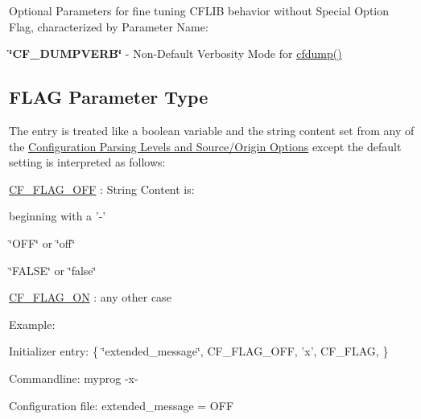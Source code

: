 Optional Parameters for fine tuning C\-F\-L\-I\-B behavior without Special Option Flag, characterized by Parameter Name\-:


\begin{DoxyItemize}
\item {\bfseries \char`\"{}\-C\-F\-\_\-\-D\-U\-M\-P\-V\-E\-R\-B\char`\"{}} -\/ Non-\/\-Default Verbosity Mode for \hyperlink{group__advanced__features_gaecfc8ee37366e1b36cb5aac0cc41ebdc}{cfdump()}
\end{DoxyItemize}\hypertarget{parameter_types_parameter_type_flag}{}\subsection{F\-L\-A\-G Parameter Type}\label{parameter_types_parameter_type_flag}
The entry is treated like a boolean variable and the string content set from any of the \hyperlink{config_levels}{Configuration Parsing Levels and Source/\-Origin Options} except the default setting is interpreted as follows\-:

\begin{DoxyItemize}
\item \hyperlink{group__cflib__core_ga7010abac2c80c121772da4d9c03332ee}{C\-F\-\_\-\-F\-L\-A\-G\-\_\-\-O\-F\-F} \-: String Content is\-:
\begin{DoxyItemize}
\item beginning with a {\ttfamily '-\/'} 
\item {\ttfamily \char`\"{}\-O\-F\-F\char`\"{}} or {\ttfamily \char`\"{}off\char`\"{}} 
\item {\ttfamily \char`\"{}\-F\-A\-L\-S\-E\char`\"{}} or {\ttfamily \char`\"{}false\char`\"{}} 
\end{DoxyItemize}\item \hyperlink{group__cflib__core_ga355c714f2912ac336b8b03468c978d8c}{C\-F\-\_\-\-F\-L\-A\-G\-\_\-\-O\-N} \-: any other case\end{DoxyItemize}
\begin{DoxyParagraph}{Example\-:}

\begin{DoxyItemize}
\item Initializer entry\-: \{ \char`\"{}extended\-\_\-message\char`\"{}, C\-F\-\_\-\-F\-L\-A\-G\-\_\-\-O\-F\-F, 'x', C\-F\-\_\-\-F\-L\-A\-G, \}
\item Commandline\-: myprog -\/x-\/
\item Configuration file\-: extended\-\_\-message = O\-F\-F 
\end{DoxyItemize}
\end{DoxyParagraph}

